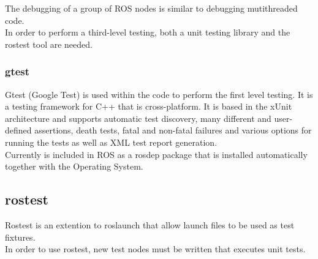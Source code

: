 	The debugging of a group of ROS nodes is similar to debugging mutithreaded code. \\

	In order to perform a third-level testing, both a unit testing library and the rostest tool are needed. 

\subsubsection{gtest}
\label{gtest}
Gtest (Google Test) is used within the code to perform the first level testing. It is a testing framework for C++ that is cross-platform. It is based in the xUnit architecture and supports automatic test discovery, many different and user-defined assertions, death tests, fatal and non-fatal failures and various options for running the tests as well as XML test report generation. 
\\

Currently is included in ROS as a rosdep package that is installed automatically together with the Operating System. 


\subsection{rostest}
\label{rostest}
Rostest is an extention to roslaunch that allow launch files to be used as test fixtures. 
\\

In order to use rostest, new test nodes must be written that executes unit tests. 